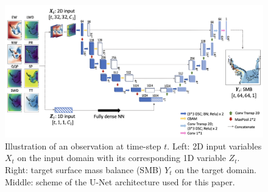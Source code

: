 \documentclass[a4paper,11pt,oneside]{report}
\begin{document}
\begin{figure}[!t]
  \centering
  \includegraphics[width=\columnwidth]{doc/Thesis-latex/images/unet-with-data.png}
  \caption []{\small Illustration of an observation at time-step $t$. Left: 2D input variables $X_t$ on the input domain with its corresponding 1D variable $Z_t$. Right: target surface mass balance (SMB) $Y_t$ on the target domain. Middle: scheme of the U-Net architecture used for this paper. }
  \vspace{-3mm}
  \label{fig:example-features}
\end{figure}
\end{document}
